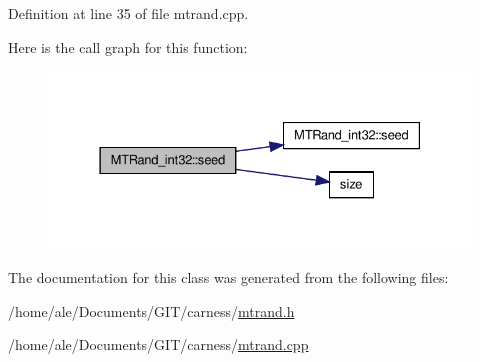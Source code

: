 Definition at line 35 of file mtrand.\-cpp.



Here is the call graph for this function\-:\nopagebreak
\begin{figure}[H]
\begin{center}
\leavevmode
\includegraphics[width=328pt]{a00013_a3cabc1e3445716236a570ffd2f69686d_cgraph}
\end{center}
\end{figure}




The documentation for this class was generated from the following files\-:\begin{DoxyCompactItemize}
\item 
/home/ale/\-Documents/\-G\-I\-T/carness/\hyperlink{a00085}{mtrand.\-h}\item 
/home/ale/\-Documents/\-G\-I\-T/carness/\hyperlink{a00084}{mtrand.\-cpp}\end{DoxyCompactItemize}
